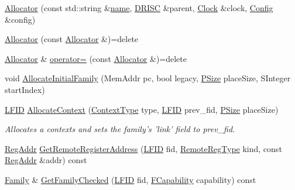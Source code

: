 \begin{DoxyCompactItemize}
\item 
\hyperlink{class_simulator_1_1drisc_1_1_allocator_a5b437c3fbb2109d529e62ae476b0c7ef}{Allocator} (const std\+::string \&\hyperlink{mtconf_8c_a8f8f80d37794cde9472343e4487ba3eb}{name}, \hyperlink{class_simulator_1_1_d_r_i_s_c}{D\+R\+I\+S\+C} \&parent, \hyperlink{class_simulator_1_1_clock}{Clock} \&clock, \hyperlink{class_config}{Config} \&config)
\item 
\hyperlink{class_simulator_1_1drisc_1_1_allocator_aa7a7175ea4041805895b804721a942f7}{Allocator} (const \hyperlink{class_simulator_1_1drisc_1_1_allocator}{Allocator} \&)=delete
\item 
\hyperlink{class_simulator_1_1drisc_1_1_allocator}{Allocator} \& \hyperlink{class_simulator_1_1drisc_1_1_allocator_a260fe03743fe739f5724f46c98f34cfd}{operator=} (const \hyperlink{class_simulator_1_1drisc_1_1_allocator}{Allocator} \&)=delete
\item 
void \hyperlink{class_simulator_1_1drisc_1_1_allocator_a4d09f3b758dd8b76885a89c465e2c5f3}{Allocate\+Initial\+Family} (Mem\+Addr pc, bool legacy, \hyperlink{namespace_simulator_a4aa07bee2f34beac11abf48a8ccc47c4}{P\+Size} place\+Size, S\+Integer start\+Index)
\item 
\hyperlink{namespace_simulator_aaccbc706b2d6c99085f52f6dfc2333e4}{L\+F\+I\+D} \hyperlink{class_simulator_1_1drisc_1_1_allocator_a657478e6ce34aec7395f127972ee5f60}{Allocate\+Context} (\hyperlink{namespace_simulator_ab3233bd11b43e37322a8111dc7eec133}{Context\+Type} type, \hyperlink{namespace_simulator_aaccbc706b2d6c99085f52f6dfc2333e4}{L\+F\+I\+D} prev\+\_\+fid, \hyperlink{namespace_simulator_a4aa07bee2f34beac11abf48a8ccc47c4}{P\+Size} place\+Size)
\begin{DoxyCompactList}\small\item\em Allocates a contexts and sets the family's 'link' field to prev\+\_\+fid. \end{DoxyCompactList}\item 
\hyperlink{struct_simulator_1_1_reg_addr}{Reg\+Addr} \hyperlink{class_simulator_1_1drisc_1_1_allocator_af76cee2225340810705b3038248ad435}{Get\+Remote\+Register\+Address} (\hyperlink{namespace_simulator_aaccbc706b2d6c99085f52f6dfc2333e4}{L\+F\+I\+D} fid, \hyperlink{namespace_simulator_aac96aab43eac55fb7f08383889feb2d8}{Remote\+Reg\+Type} kind, const \hyperlink{struct_simulator_1_1_reg_addr}{Reg\+Addr} \&addr) const 
\item 
\hyperlink{struct_simulator_1_1drisc_1_1_family}{Family} \& \hyperlink{class_simulator_1_1drisc_1_1_allocator_a2e6106a71e49b7468ffeb6f8e66f3ab3}{Get\+Family\+Checked} (\hyperlink{namespace_simulator_aaccbc706b2d6c99085f52f6dfc2333e4}{L\+F\+I\+D} fid, \hyperlink{namespace_simulator_a607aa9969bfe2711861ae21f42c37c59}{F\+Capability} capability) const 

\end{DoxyCompactItemize}
